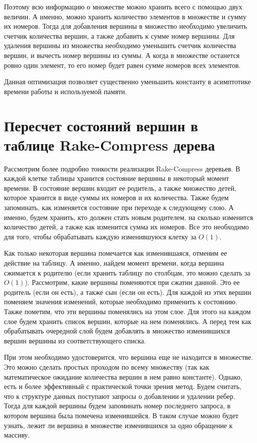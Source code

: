 Поэтому всю информацию о множестве можно хранить всего с помощью двух величин. А именно, можно хранить количество элементов в множестве и сумму их номеров. 
Тогда для добавления вершины в множество необходимо увеличить счетчик количества вершин, а также добавить к сумме номер вершины. 
Для удаления вершины из множества необходимо уменьшить счетчик количества вершин, и вычесть номер вершины из суммы. 
А когда в множестве останется ровно один элемент, то его номер будет равен сумме номеров всех элементов.

Данная оптимизация позволяет существенно уменьшить константу в асимптотике времени работы и используемой памяти. 

\FloatBarrier
\section{Пересчет состояний вершин в таблице Rake-Compress дерева}

Рассмотрим более подробно тонкости реализации Rake-Compress деревьев. В каждой клетке таблицы хранится состояние вершины в некоторый момент времени. 
В состояние вершин входит ее родитель, а также множество детей, которое хранится в виде суммы их номеров и их количества. Также будем запоминать, 
как изменяется состояние при переходе к следующему слою. А именно, будем хранить, кто должен стать новым родителем, на сколько изменится количество детей, а также как изменится сумма их номеров. 
Все это необходимо для того, чтобы обрабатывать каждую изменившуюся клетку за $O(1)$. 

Как только некоторая вершина помечается как изменившаяся, отменим ее действие на таблицу. 
А именно, найдем момент времени, когда вершина сжимается к родителю (если хранить таблицу по столбцам, это можно сделать за $O(1)$).
Рассмотрим, какие вершины поменяются при сжатии данной. Это ее родитель (если он есть), а также сын (если он есть).
Для каждой из этих вершин поменяем значения изменений, которые необходимо применить к состоянию. 
Также пометим, что эти вершины поменялись на этом слое. Для этого на каждом слое будем хранить список вершин, которые на нем поменялись. 
А перед тем как обрабатывать очередной слой будем добавлять в множество изменившихся вершин вершины из соответствующего списка. 

При этом необходимо удостоверится, что вершина еще не находится в множестве. 
Это можно сделать простых проходом по всему множеству (так как математическое ожидание количества вершин в нем равно константе).
Однако, есть и более эффективный с практической точки зрения метод. Будем считать, что к структуре данных поступают запросы о добавлении и удалении ребер. 
Тогда для каждой вершины будем запоминать номер последнего запроса, в котором вершина была помечена изменившейся. 
В таком случае можно будет узнать, лежит ли вершина в множестве изменившихся за одно обращение к массиву.

